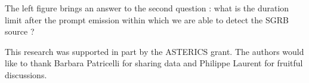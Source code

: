 \documentclass[a0,portrait]{a0poster}
\begin{document}
\begin{multicols}{2}
The left figure brings an answer to the second question : what is the duration
limit after the prompt emission within which we are able to detect the SGRB
source ?





\vspace{10mm}

{\footnotesize 
  This research was supported in part by the ASTERICS grant. The authors would like to thank Barbara Patricelli for sharing data and Philippe Laurent for fruitful discussions. }




\end{multicols}
\end{document}

